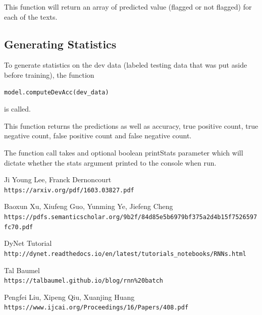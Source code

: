 \documentclass[twoside,twocolumn]{article}
\begin{document}
This function will return an array of predicted value (flagged or not flagged) for each of the texts.


\subsection{Generating Statistics}

To generate statistics on the dev data (labeled testing data that was put aside before training),
the function
\begin{lstlisting}
model.computeDevAcc(dev_data)
\end{lstlisting}
is called.

This function returns the predictions as well as accuracy, true positive count, true negative count,
 false positive count and false negative count.

The function call takes and optional boolean printStats parameter which will dictate whether the stats argument
printed to the console when run.


\begin{thebibliography}{99} %

Ji Young Lee, Franck Dernoncourt
\\\texttt{https://arxiv.org/pdf/1603.03827.pdf}

Baoxun Xu, Xiufeng Guo, Yunming Ye, Jiefeng Cheng
\\\texttt{https://pdfs.semanticscholar.org/9b2f/84d85e5b6979bf375a2d4b15f7526597fc70.pdf}

DyNet Tutorial
\\\texttt{http://dynet.readthedocs.io/en/latest/tutorials_notebooks/RNNs.html}

Tal Baumel
\\\texttt{https://talbaumel.github.io/blog/rnn\%20batch}

Pengfei Liu, Xipeng Qiu, Xuanjing Huang
\\\texttt{https://www.ijcai.org/Proceedings/16/Papers/408.pdf}

\end{thebibliography}
   
\end{document}
